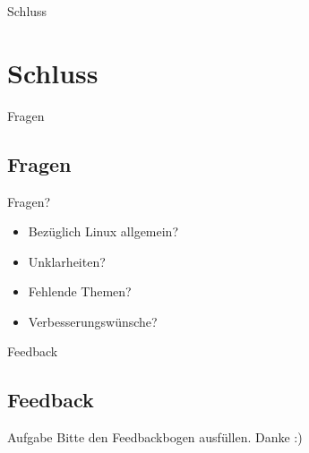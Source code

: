 
\begin{frame}{Schluss}
    \section{Schluss}\label{sec:schluss}
\end{frame}

\begin{frame}{Fragen}
    \subsection{Fragen}\label{subsec:Fragen}

    Fragen?

    \begin{itemize}
        \item Bezüglich Linux allgemein?
        \item Unklarheiten?
        \item Fehlende Themen?
        \item Verbesserungswünsche?
    \end{itemize}

\end{frame}

\begin{frame}{Feedback}
    \subsection{Feedback}\label{subsec:feedback}

    \vspace{0.5cm}
    \begin{alertblock}{Aufgabe}
        Bitte den Feedbackbogen ausfüllen.
        \linebreak
        Danke :)
    \end{alertblock}

\end{frame}